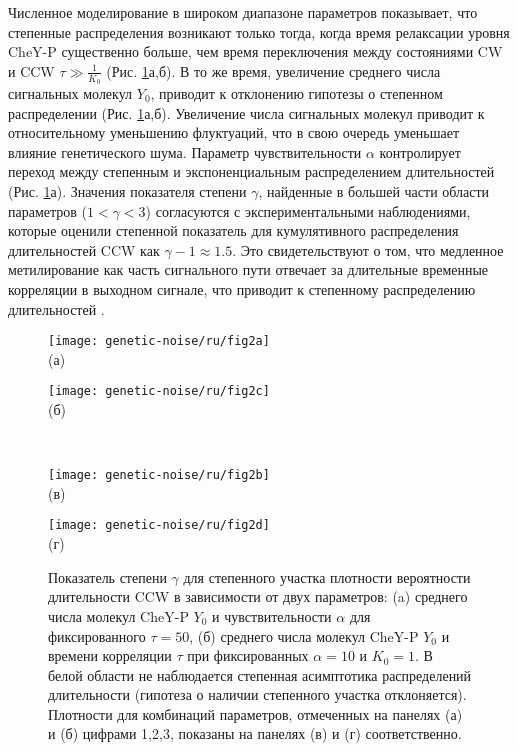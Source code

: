 Численное моделирование в широком диапазоне параметров показывает, что степенные распределения возникают только тогда, когда время релаксации уровня CheY-P существенно больше, чем время переключения между состояниями CW и CCW $\tau \gg \frac{1}{K_0}$ (Рис. \cref{fig:pdf-gamma-grid-1}а,б). В то же время, увеличение среднего числа сигнальных молекул $Y_0$, приводит к отклонению гипотезы о степенном распределении (Рис. \cref{fig:pdf-gamma-grid-1}а,б). Увеличение числа сигнальных молекул приводит к относительному уменьшению флуктуаций, что в свою очередь уменьшает влияние генетического шума. Параметр чувствительности $\alpha$ контролирует переход между степенным и экспоненциальным распределением длительностей (Рис. \cref{fig:pdf-gamma-grid-1}а). Значения показателя степени $\gamma$, найденные в большей части области параметров ($1 < \gamma < 3$) согласуются с экспериментальными наблюдениями, которые оценили степенной показатель для кумулятивного распределения длительностей CCW как $\gamma - 1 \approx 1.5$. Это свидетельствуют о том, что медленное метилирование как часть сигнального пути отвечает за длительные временные корреляции в выходном сигнале, что приводит к степенному распределению длительностей \cite{korobkova_molecular_2004}. 


\begin{figure}[ht]
    \begin{minipage}[b][][b]{0.49\linewidth}\centering
        \texttt{[image: genetic-noise/ru/fig2a]} \\ (а)
    \end{minipage}
    \hfill
    \begin{minipage}[b][][b]{0.49\linewidth}\centering
        \texttt{[image: genetic-noise/ru/fig2c]} \\ (б)
    \end{minipage}\\
    \begin{minipage}[b][][b]{0.49\linewidth}\centering
        \texttt{[image: genetic-noise/ru/fig2b]} \\ (в)
    \end{minipage}
    \hfill
    \begin{minipage}[b][][b]{0.49\linewidth}\centering
        \texttt{[image: genetic-noise/ru/fig2d]} \\ (г)
    \end{minipage}
    \caption{
        Показатель степени $\gamma$ для степенного участка плотности вероятности длительности CCW в зависимости от двух параметров: (a) среднего числа молекул CheY-P $Y_0$ и чувствительности $\alpha$ для фиксированного $\tau = 50$, (б) среднего числа молекул CheY-P $Y_0$ и времени корреляции $\tau$ при фиксированных $\alpha = 10$ и $K_0 = 1$. В белой области не наблюдается степенная асимптотика распределений длительности (гипотеза о наличии степенного участка отклоняется). Плотности для комбинаций параметров, отмеченных на панелях (а) и (б) цифрами 1,2,3, показаны на панелях (в) и (г) соответственно. 
    }\label{fig:pdf-gamma-grid-1}
\end{figure}

